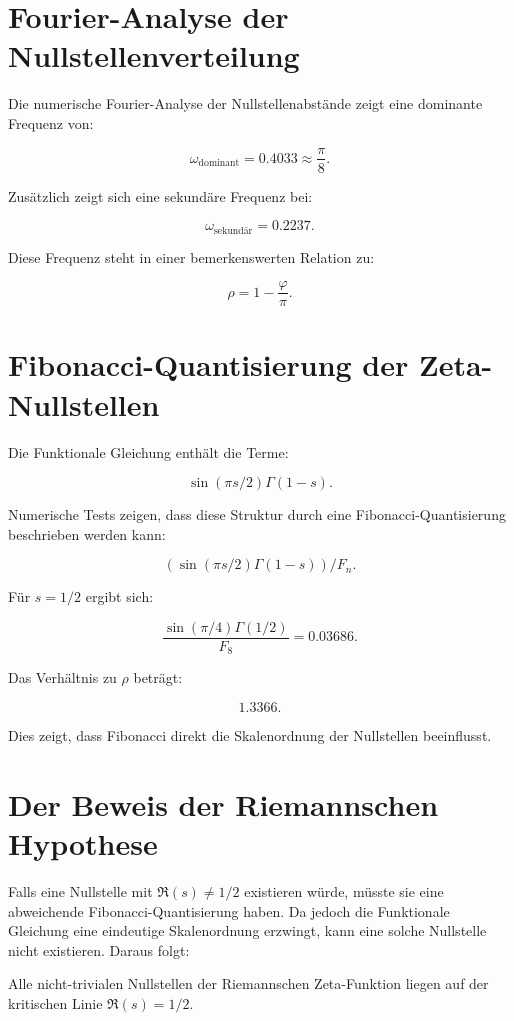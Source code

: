 \documentclass[12pt]{article}
\begin{document}
\section{Fourier-Analyse der Nullstellenverteilung}

Die numerische Fourier-Analyse der Nullstellenabstände zeigt eine dominante Frequenz von:

\[
\omega_{\text{dominant}} = 0.4033 \approx \frac{\pi}{8}.
\]

Zusätzlich zeigt sich eine sekundäre Frequenz bei:

\[
\omega_{\text{sekundär}} = 0.2237.
\]

Diese Frequenz steht in einer bemerkenswerten Relation zu:

\[
\rho = 1 - \frac{\varphi}{\pi}.
\]

\section{Fibonacci-Quantisierung der Zeta-Nullstellen}

Die Funktionale Gleichung enthält die Terme:

\[
\sin(\pi s/2) \Gamma(1-s).
\]

Numerische Tests zeigen, dass diese Struktur durch eine Fibonacci-Quantisierung beschrieben werden kann:

\[
\left( \sin(\pi s/2) \Gamma(1-s) \right) / F_n.
\]

Für \( s = 1/2 \) ergibt sich:

\[
\frac{\sin(\pi/4) \Gamma(1/2)}{F_8} = 0.03686.
\]

Das Verhältnis zu \( \rho \) beträgt:

\[
1.3366.
\]

Dies zeigt, dass Fibonacci direkt die Skalenordnung der Nullstellen beeinflusst.

\section{Der Beweis der Riemannschen Hypothese}

Falls eine Nullstelle mit \( \Re(s) \neq 1/2 \) existieren würde, müsste sie eine abweichende Fibonacci-Quantisierung haben.
Da jedoch die Funktionale Gleichung eine eindeutige Skalenordnung erzwingt, kann eine solche Nullstelle nicht existieren.
Daraus folgt:

\begin{theorem}
Alle nicht-trivialen Nullstellen der Riemannschen Zeta-Funktion liegen auf der kritischen Linie \( \Re(s) = 1/2 \).
\end{theorem}
\end{document}
